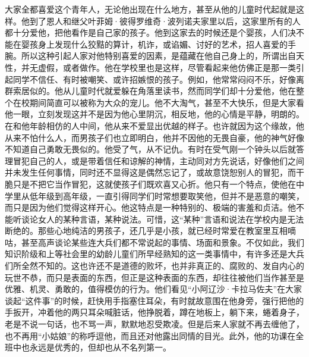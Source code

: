 \par 大家全都喜爱这个青年人，无论他出现在什么地方，甚至从他的儿童时代起就是这样。他到了恩人和继父叶菲姆·彼得罗维奇·波列诺夫家里以后，这家里所有的人都十分爱他，把他看作是自己家的孩子。他到这家去的时候还是个婴孩，人们决不能在婴孩身上发现什么狡黠的算计，机诈，或谄媚、讨好的艺术，招人喜爱的手腕。所以这种引起人家对他特别喜爱的因素，是蕴藏在他自己身上的，所谓出自天性，并无虚假，或者做作。他在学校里也是这样，尽管看起来他仿佛正是那一类引起同学不信任、有时被嘲笑、或许招嫉恨的孩子。例如，他常常闷闷不乐，好像离群索居似的。他从儿童时代就爱躲在角落里读书，然而同学们却十分爱他，他在整个在校期间简直可以被称为大众的宠儿。他不大淘气，甚至不大快乐，但是大家看他一眼，立刻发现这并不是因为他心里阴沉，相反地，他的心情是平静，明朗的。在和他年龄相仿的人中间，他从来不爱显出优越的样子。也许就因为这个缘故，他从来不怕什么人，而男孩子们也立即明白，他并不因他的无畏自豪，他的神气好像不知道自己勇敢无畏似的。他受了气，从不记仇。有时在受气刚一个钟头以后就答理冒犯自己的人，或是带着信任和谅解的神情，主动同对方先说话，好像他们之间并未发生任何事情，同时还不显得这是偶然忘记了，或故意饶恕别人的冒犯，而干脆只是不把它当作冒犯，这就使孩子们既欢喜又心折。他只有一个特点，使他在中学里从低年级到高年级，一直引得同学们时常想要取笑他，但并不是恶意的嘲笑，而只是因为他们觉得这样开心。他这特点是一种特别的、极端的害羞和贞洁。他不能听谈论女人的某种言语，某种说法。可惜，这“某种”言语和说法在学校内是无法断绝的。那些心地纯洁的男孩子，还几乎是小孩，就已经时常爱在教室里互相嘀咕，甚至高声谈论某些连大兵们都不常说起的事情、场面和景象。不仅如此，我们知识阶级和上等社会里的幼龄儿童们所早经熟知的这一类事情中，有许多还是大兵们所全然不知的。这也许还不是道德的败坏，也并非真正的、腐败的、发自内心的玩世不恭，而只是表面的东西，但正是这种表面的东西，却往往被他们当作甚至是优雅、机灵、勇敢的，值得模仿的行为。他们看见“小阿辽沙·卡拉马佐夫”在大家谈起“这件事”的时候，赶快用手指塞住耳朵，有时就故意围在他身旁，强行把他的手扳开，冲着他的两只耳朵喊脏话，他挣脱着，蹲在地板上，躺下来，蜷着身子，老是不说一句话，也不骂一声，默默地忍受欺凌。但是后来人家就不再去缠他了，也不再用“小姑娘”的称呼逗他，而且还对他露出同情的目光。此外，他的功课在全班中也永远是优秀的，但却也从不名列第一。
